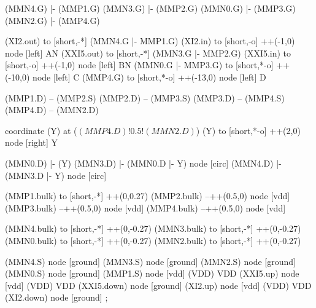 \begin{circuitikz}[american]

	(MMN4.G) |- (MMP1.G)
	(MMN3.G) |- (MMP2.G)
	(MMN0.G) |- (MMP3.G)
	(MMN2.G) |- (MMP4.G)
	
	(XI2.out) to [short,-*] (MMN4.G |- MMP1.G)
	(XI2.in) to [short,-o] ++(-1,0) node [left] {AN}
	(XXI5.out) to [short,-*] (MMN3.G |- MMP2.G)
	(XXI5.in) to [short,-o] ++(-1,0) node [left] {BN}
	(MMN0.G |- MMP3.G) to [short,*-o] ++(-10,0) node [left] {C}
	(MMP4.G) to [short,*-o] ++(-13,0) node [left] {D}	
	
	(MMP1.D) -- (MMP2.S)
	(MMP2.D) -- (MMP3.S)	
	(MMP3.D) -- (MMP4.S)
	(MMP4.D) -- (MMN2.D)
	
	coordinate (Y) at ($(MMP4.D)!0.5!(MMN2.D)$)
	(Y) to [short,*-o] ++(2,0) node [right] {Y}
	
	(MMN0.D) |- (Y)
	(MMN3.D) |- (MMN0.D |- Y) node [circ] {}
	(MMN4.D) |- (MMN3.D |- Y) node [circ] {}
	
	(MMP1.bulk) to [short,-*] ++(0,0.27)
	(MMP2.bulk) --++(0.5,0) node [vdd] {}
	(MMP3.bulk) --++(0.5,0) node [vdd] {}
	(MMP4.bulk) --++(0.5,0) node [vdd] {}
	
	(MMN4.bulk) to [short,-*] ++(0,-0.27)
	(MMN3.bulk) to [short,-*] ++(0,-0.27)
	(MMN0.bulk) to [short,-*] ++(0,-0.27)
	(MMN2.bulk) to [short,-*] ++(0,-0.27)


	(MMN4.S) node [ground] {}
	(MMN3.S) node [ground] {}
	(MMN2.S) node [ground] {}
	(MMN0.S) node [ground] {}
	(MMP1.S) node [vdd] (VDD) {VDD}
	(XXI5.up) node [vdd] (VDD) {VDD}
	(XXI5.down) node [ground] {}
	(XI2.up) node [vdd] (VDD) {VDD}
	(XI2.down) node [ground] {}
;

\end{circuitikz}
